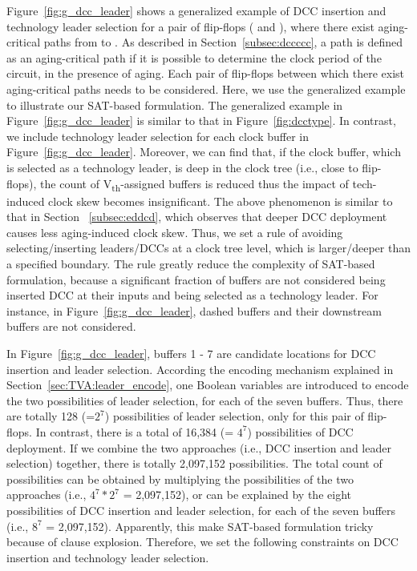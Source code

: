 Figure~\ref{fig:g_dcc_leader} shows a generalized example of DCC insertion and technology leader selection for a pair of flip-flops ( and ), where there exist aging-critical paths from  to . As described in Section~\ref{subsec:dccccc}, a path is defined as an aging-critical path if it is possible to determine the clock period of the circuit, in the presence of aging. Each pair of flip-flops between which there exist aging-critical paths needs to be considered. Here, we use the generalized example to illustrate our SAT-based formulation. The generalized example in Figure~\ref{fig:g_dcc_leader} is similar to that in Figure~\ref{fig:dcctype}. In contrast, we include technology leader selection for each clock buffer in Figure~\ref{fig:g_dcc_leader}. Moreover, we can find that, if the clock buffer, which is selected as a technology leader, is deep in the clock tree (i.e., close to flip-flops), the count of V\textsubscript{th}-assigned buffers is reduced thus the impact of tech-induced clock skew becomes insignificant. The above phenomenon is similar to that in Section ~\ref{subsec:eddcd}, which observes that deeper DCC deployment causes less aging-induced clock skew. Thus, we set a rule of avoiding selecting/inserting leaders/DCCs at a clock tree level, which is larger/deeper than a specified boundary.  The rule greatly reduce the complexity of SAT-based formulation, because a significant fraction of buffers are not considered being inserted DCC at their inputs and being selected as a technology leader. For instance, in Figure~\ref{fig:g_dcc_leader}, dashed buffers and their downstream buffers are not considered. 

In Figure~\ref{fig:g_dcc_leader}, buffers 1 - 7 are candidate locations for DCC insertion and leader selection. According the encoding mechanism explained in Section~\ref{sec:TVA:leader_encode}, one Boolean variables are introduced to encode the two possibilities of leader selection, for each of the seven buffers. Thus, there are totally 128 (=$2^7$) possibilities of leader selection, only for this pair of flip-flops. In contrast, there is a total of 16,384 (= $4^7$) possibilities of DCC  deployment. If we combine the two approaches (i.e., DCC insertion and leader selection) together, there is totally 2,097,152 possibilities. The total count of possibilities can be obtained by multiplying the possibilities of the two approaches (i.e., $4^7*2^7$ = 2,097,152), or can be explained by the eight possibilities of DCC insertion and leader selection, for each of the seven buffers (i.e., $8^7$ = 2,097,152). Apparently, this make SAT-based formulation tricky because of clause explosion. Therefore, we set the following constraints on DCC insertion and technology leader selection.

